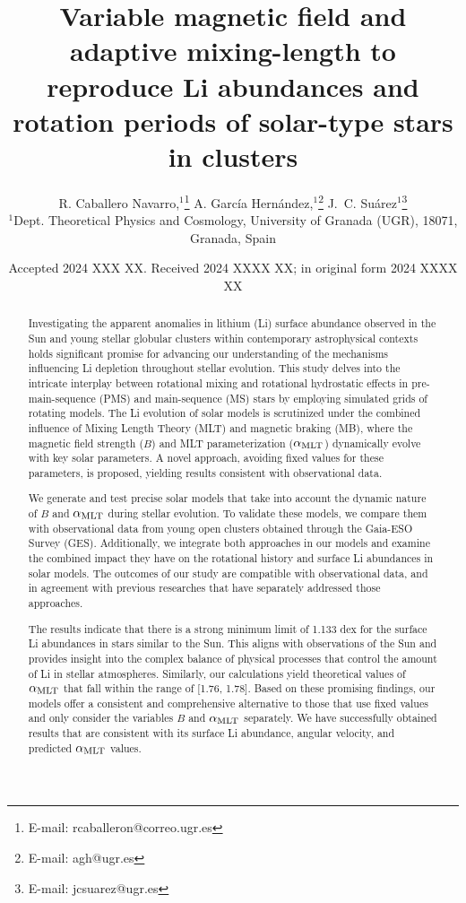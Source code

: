 \documentclass[fleqn,usenatbib]{mnras}
\title[Rotation, magnetic braking \& Li abundances]{Variable magnetic field and adaptive mixing-length to reproduce Li abundances and rotation periods of solar-type stars in clusters}
\author[R. Caballero Navarro et al.]{
R. Caballero Navarro,$^{1}$\thanks{E-mail: rcaballeron@correo.ugr.es}
A. Garc\'ia Hern\'andez,$^{1}$\thanks{E-mail: agh@ugr.es}
J.~C. Su\'arez$^{1}$\thanks{E-mail: jcsuarez@ugr.es}
\\
$^{1}$Dept. Theoretical Physics and Cosmology, University of Granada (UGR), 18071, Granada, Spain\\
}
\date{Accepted 2024 XXX XX. Received 2024 XXXX XX; in original form 2024 XXXX XX}
\begin{document}
\label{firstpage}
\pagerange{\pageref{firstpage}--\pageref{lastpage}}
\maketitle

\begin{abstract}
Investigating the apparent anomalies in lithium (Li) surface abundance observed in the Sun and young stellar globular clusters within contemporary astrophysical contexts holds significant promise for advancing our understanding of the mechanisms influencing Li depletion throughout stellar evolution. This study delves into the intricate interplay between rotational mixing and rotational hydrostatic effects in pre-main-sequence (PMS) and main-sequence (MS) stars by employing simulated grids of rotating models. The Li evolution of solar models is scrutinized under the combined influence of Mixing Length Theory (MLT) and magnetic braking (MB), where the magnetic field strength ($B$) and MLT parameterization ($\alpha_{\mathrm{MLT}}$) dynamically evolve with key solar parameters. A novel approach, avoiding fixed values for these parameters, is proposed, yielding results consistent with observational data.\par

We generate and test precise solar models that take into account the dynamic nature of $B$ and $\alpha_{\mathrm{MLT}}$ during stellar evolution. To validate these models, we compare them with observational data from young open clusters obtained through the Gaia-ESO Survey (GES). Additionally, we integrate both approaches in our models and examine the combined impact they have on the rotational history and surface Li abundances in solar models. The outcomes of our study are compatible with observational data, and in agreement with previous researches that have separately addressed those approaches.\par

The results indicate that there is a strong minimum limit of 1.133 dex for the surface Li abundances in stars similar to the Sun. This aligns with observations of the Sun and provides insight into the complex balance of physical processes that control the amount of Li in stellar atmospheres. Similarly, our calculations yield theoretical values of $\alpha_{\mathrm{MLT}}$ that fall within the range of [1.76, 1.78]. Based on these promising findings, our models offer a consistent and comprehensive alternative to those that use fixed values and only consider the variables $B$ and $\alpha_{\mathrm{MLT}}$ separately. We have successfully obtained results that are consistent with its surface Li abundance, angular velocity, and predicted $\alpha_{\mathrm{MLT}}$ values.

\end{abstract}
\end{document}
